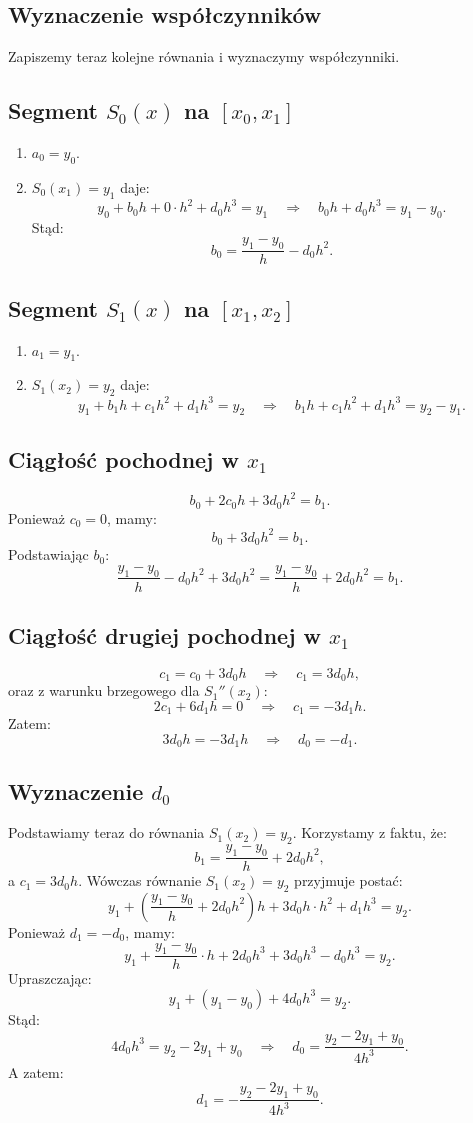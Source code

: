 \documentclass{article}
\begin{document}
\subsection{Wyznaczenie współczynników}
Zapiszemy teraz kolejne równania i wyznaczymy współczynniki.

\subsection*{Segment \(S_0(x)\) na \([x_0,x_1]\)}
\begin{enumerate}
    \item \(a_0=y_0.\)
    \item \(S_0(x_1)=y_1\) daje:
    \[
    y_0+b_0h+0\cdot h^2+d_0h^3=y_1 \quad \Longrightarrow \quad b_0h+d_0h^3=y_1-y_0.
    \]
    Stąd:
    \[
    b_0=\frac{y_1-y_0}{h}-d_0h^2.
    \]
\end{enumerate}

\subsection*{Segment \(S_1(x)\) na \([x_1,x_2]\)}
\begin{enumerate}
    \item \(a_1=y_1.\)
    \item \(S_1(x_2)=y_2\) daje:
    \[
    y_1+b_1h+c_1h^2+d_1h^3=y_2 \quad \Longrightarrow \quad b_1h+c_1h^2+d_1h^3=y_2-y_1.
    \]
\end{enumerate}

\subsection*{Ciągłość pochodnej w \(x_1\)}
\[
b_0+2c_0h+3d_0h^2=b_1.
\]
Ponieważ \(c_0=0\), mamy:
\[
b_0+3d_0h^2=b_1.
\]
Podstawiając \(b_0\):
\[
\frac{y_1-y_0}{h}-d_0h^2+3d_0h^2=\frac{y_1-y_0}{h}+2d_0h^2=b_1.
\]

\subsection*{Ciągłość drugiej pochodnej w \(x_1\)}
\[
c_1=c_0+3d_0h \quad \Longrightarrow \quad c_1=3d_0h,
\]
oraz z warunku brzegowego dla \(S_1''(x_2)\):
\[
2c_1+6d_1h=0 \quad \Longrightarrow \quad c_1=-3d_1h.
\]
Zatem:
\[
3d_0h=-3d_1h \quad \Longrightarrow \quad d_0=-d_1.
\]

\subsection{Wyznaczenie \(d_0\)}
Podstawiamy teraz do równania \(S_1(x_2)=y_2\). Korzystamy z faktu, że:
\[
b_1=\frac{y_1-y_0}{h}+2d_0h^2,
\]
a \(c_1=3d_0h\). Wówczas równanie \(S_1(x_2)=y_2\) przyjmuje postać:
\[
y_1+\left(\frac{y_1-y_0}{h}+2d_0h^2\right)h+3d_0h\cdot h^2+d_1h^3=y_2.
\]
Ponieważ \(d_1=-d_0\), mamy:
\[
y_1+\frac{y_1-y_0}{h}\cdot h+2d_0h^3+3d_0h^3-d_0h^3=y_2.
\]
Upraszczając:
\[
y_1+(y_1-y_0)+4d_0h^3=y_2.
\]
Stąd:
\[
4d_0h^3=y_2-2y_1+y_0 \quad \Longrightarrow \quad d_0=\frac{y_2-2y_1+y_0}{4h^3}.
\]
A zatem:
\[
d_1=-\frac{y_2-2y_1+y_0}{4h^3}.
\]
\end{document}
